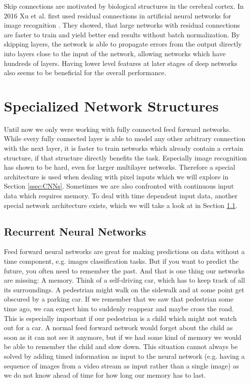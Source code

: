 \begin{enumerate}
  Skip connections are motivated by biological structures in the cerebral cortex. In 2016 Xu et al. first used residual connections in artificial neural networks for image recognition \cite{he2016deep}. They showed, that large networks with residual connections are faster to train and yield better end results without batch normalization. By skipping layers, the network is able to propagate errors from the output directly into layers close to the input of the network, allowing networks which have hundreds of layers. Having lower level features at later stages of deep networks also seems to be beneficial for the overall performance.
\end{enumerate}

\section{Specialized Network Structures} \label{sec:SpecializedNetworks}
Until now we only were working with fully connected feed forward networks. While every fully connected layer is able to model any other arbitrary connection with the next layer, it is faster to train networks which already contain a certain structure, if that structure directly benefits the task. Especially image recognition has shown to be hard, even for larger multilayer networks. Therefore a special architecture is used when dealing with pixel inputs which we will explore in Section \ref{ssec:CNNs}. Sometimes we are also confronted with continuous input data which requires memory. To deal with time dependent input data, another special network architecture exists, which we will take a look at in Section \ref{ssec:RNNs}. 

\subsection{Recurrent Neural Networks} \label{ssec:RNNs}
Feed forward neural networks are great for making predictions on data without a time component, e.g. images classification tasks. But if you want to predict the future, you often need to remember the past. And that is one thing our networks are missing: A memory. Think of a self-driving car, which has to keep track of all its surroundings. A pedestrian might walk on the sidewalk and at some point get obscured by a parking car. If we remember that we saw that pedestrian some time ago, we can expect him to suddenly reappear and maybe cross the road. This is especially important if our pedestrian is a child which might not watch out for a car. A normal feed forward network would forget about the child as soon as it can not see it anymore, but if we had some kind of memory we would be able to remember the child and slow down. This situation cannot always be solved by adding timed information as input to the neural network (e.g. having a sequence of images from a video stream as input rather than a single image) as we do not know ahead of time for how long our memory has to last. 

